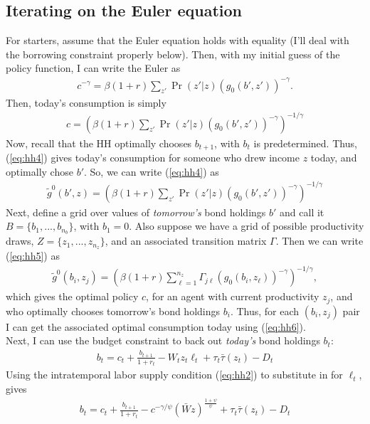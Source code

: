 \documentclass[12pt]{article}
\begin{document}
\subsection{Iterating on the Euler equation}
For starters, assume that the Euler equation holds with equality (I'll deal with the borrowing constraint properly below). Then, with my initial guess of the policy function, I can write the Euler as
\begin{align*}
c^{-\gamma} = \beta(1+r) \sum_{z'}\Pr(z'|z)(g_0(b',z'))^{-\gamma}.
\end{align*}
Then, today's consumption is simply
\begin{align}
c = \left( \beta(1+r) \sum_{z'}\Pr(z'|z)(g_0(b',z'))^{-\gamma}\right)^{-1/\gamma} \label{eq:hh4}
\end{align}
Now, recall that the HH optimally chooses $b_{t+1}$, with $b_t$ is predetermined. Thus, (\ref{eq:hh4}) gives today's consumption for someone who drew income $z$ today, and optimally chose $b'$. So, we can write (\ref{eq:hh4}) as
\begin{align}
\tilde g^0(b',z) = \left( \beta(1+r) \sum_{z'}\Pr(z'|z)(g_0(b',z'))^{-\gamma}\right)^{-1/\gamma} \label{eq:hh5}
\end{align}
Next, define a grid over values of \textit{tomorrow's} bond holdings $b'$ and call it $B = \{b_1, ...,b_{n_b}\}$, with $b_1 = 0$. Also suppose we have a grid of possible productivity draws, $Z=\{z_1, ..., z_{n_z}\}$, and an associated transition matrix $\Gamma$. Then we can write (\ref{eq:hh5}) as
\begin{align}
\tilde g^0(b_i,z_j) = \left( \beta(1+r) \sum_{\ell=1}^{n_z}\Gamma_{j\ell} (g_0(b_i,z_\ell))^{-\gamma}\right)^{-1/\gamma} \label{eq:hh6}, 
\end{align}
which gives the optimal policy $c$, for an agent with current productivity $z_j$, and who optimally chooses tomorrow's bond holdings $b_i$. Thus, for each $(b_i, z_j)$ pair I can get the associated optimal consumption today using (\ref{eq:hh6}).\\

Next, I can use the budget constraint to back out \textit{today's} bond holdings $b_t$:
\begin{align*}
b_t = c_t + \frac{b_{t+1}}{1+r_t} -  W_tz_t\ell_t + \tau_t\bar\tau(z_t) - D_t
\end{align*}
Using the intratemporal labor supply condition (\ref{eq:hh2}) to substitute in for $\ell_t$, gives
\begin{align*}
b_t = c_t + \frac{b_{t+1}}{1+r_t} -  c^{-\gamma/\psi}(\bar Wz)^{\frac{1+\psi}{\psi}} + \tau_t\bar\tau(z_t) - D_t
\end{align*}
\end{document}
